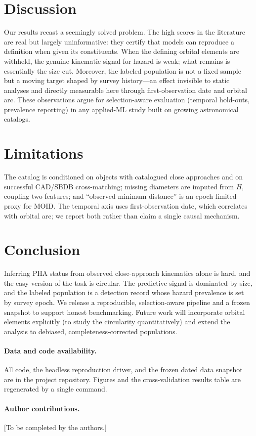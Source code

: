 \documentclass[11pt]{article}
\begin{document}
\section{Discussion}
Our results recast a seemingly solved problem. The high scores in the literature are
real but largely uninformative: they certify that models can reproduce a definition
when given its constituents. When the defining orbital elements are withheld, the
genuine kinematic signal for hazard is weak; what remains is essentially the size
cut. Moreover, the labeled population is not a fixed sample but a moving target shaped
by survey history---an effect invisible to static analyses and directly measurable
here through first-observation date and orbital arc. These observations argue for
selection-aware evaluation (temporal hold-outs, prevalence reporting) in any
applied-ML study built on growing astronomical catalogs.

\section{Limitations}
The catalog is conditioned on objects with catalogued close approaches and on
successful CAD/SBDB cross-matching; missing diameters are imputed from $H$, coupling
two features; and ``observed minimum distance'' is an epoch-limited proxy for MOID.
The temporal axis uses first-observation date, which correlates with orbital arc; we
report both rather than claim a single causal mechanism.

\section{Conclusion}
Inferring PHA status from observed close-approach kinematics alone is hard, and the
easy version of the task is circular. The predictive signal is dominated by size, and
the labeled population is a detection record whose hazard prevalence is set by survey
epoch. We release a reproducible, selection-aware pipeline and a frozen snapshot to
support honest benchmarking. Future work will incorporate orbital elements explicitly
(to study the circularity quantitatively) and extend the analysis to debiased,
completeness-corrected populations.

\paragraph{Data and code availability.}
All code, the headless reproduction driver, and the frozen dated data snapshot are in
the project repository. Figures and the cross-validation results table are
regenerated by a single command.

\paragraph{Author contributions.}
[To be completed by the authors.]



\end{document}
